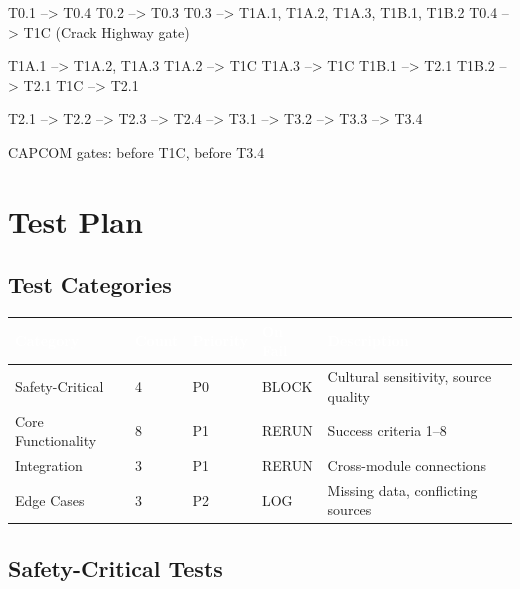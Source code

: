 \documentclass[11pt,letterpaper]{article}
\newcommand{\tableheader}[1]{\textbf{\sffamily\textcolor{white}{#1}}}
\begin{document}
\begin{asciibox}
T0.1 --> T0.4
T0.2 --> T0.3
T0.3 --> T1A.1, T1A.2, T1A.3, T1B.1, T1B.2
T0.4 --> T1C (Crack Highway gate)

T1A.1 --> T1A.2, T1A.3
T1A.2 --> T1C
T1A.3 --> T1C
T1B.1 --> T2.1
T1B.2 --> T2.1
T1C   --> T2.1

T2.1 --> T2.2 --> T2.3 --> T2.4 --> T3.1 --> T3.2 --> T3.3 --> T3.4

CAPCOM gates: before T1C, before T3.4
\end{asciibox}

\section{Test Plan}

\subsection{Test Categories}

\begin{center}
\begin{tabularx}{\textwidth}{L{3cm}C{1.5cm}C{1.5cm}L{2cm}X}
\toprule
{}
\tableheader{Category} & \tableheader{Count} & \tableheader{Priority} & \tableheader{On Fail} & \tableheader{Description} \\
\midrule
Safety-Critical & 4 & P0 & BLOCK & Cultural sensitivity, source quality \\
Core Functionality & 8 & P1 & RERUN & Success criteria 1--8 \\
Integration & 3 & P1 & RERUN & Cross-module connections \\
Edge Cases & 3 & P2 & LOG & Missing data, conflicting sources \\
\bottomrule
\end{tabularx}
\end{center}

\subsection{Safety-Critical Tests}
\end{document}
